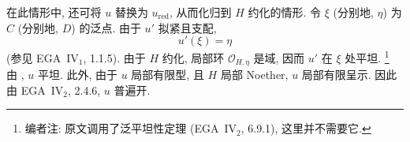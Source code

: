在此情形中, 还可将 \(u\) 替换为 \(u_{\mathrm{red}}\),
从而化归到 \(H\) 约化的情形.
令 \(\xi\) (分别地, \(\eta\)) 为 \(C\) (分别地, \(D\)) 的泛点.
由于 \(u'\) 拟紧且支配,
\[
  u'(\xi)=\eta
\]
(参见 EGA~IV\(_1\), 1.1.5).
由于 \(H\) 约化, 局部环 \(\mathcal O_{H,\eta}\) 是域,
因而 \(u'\) 在 \(\xi\) 处平坦.%
\footnote{\label{note:sga3-VIB-11}编者注:
原文调用了泛平坦性定理 (EGA~IV\(_2\), 6.9.1), 这里并不需要它.}
由 , \(u\) 平坦.
此外, 由于 \(u\) 局部有限型, 且 \(H\) 局部 Noether,
\(u\) 局部有限呈示. 因此由 EGA~IV\(_2\), 2.4.6, \(u\) 普遍开.
